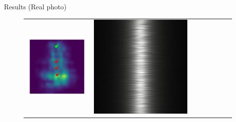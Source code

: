 \documentclass[final]{beamer}
\newlength{\twocolwid}
\newlength{\resultwidth}
\begin{document}
\begin{frame}[t]
\begin{columns}[t]
\begin{column}{\twocolwid}
\begin{block}{Results (Real photo)}
\begin{figure}[t]
\begin{tabular}{ccrclccc}
            		\includegraphics[width=\resultwidth]{real/metal/posterior.pdf} &
            		\includegraphics[width=\resultwidth]{real/metal/good1.jpg} &

\end{tabular}
\end{figure}
\end{block}
\end{column}
\end{columns}
\end{frame}
\end{document}

